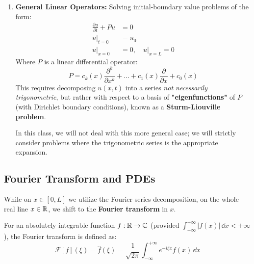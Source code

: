 \begin{remark}
\begin{enumerate}
    \item \textbf{General Linear Operators:} Solving initial-boundary value problems of the form:
    \begin{align*}
        \frac{\partial u}{\partial t} + P u &= 0 \\
        u|_{t=0} &= u_0 \\
        u|_{x=0} &= 0, \quad u|_{x=L} = 0
    \end{align*}
    Where $P$ is a linear differential operator:
    \begin{equation*}
        P = c_k(x) \frac{\partial^k}{\partial x^k} + \dots + c_1(x) \frac{\partial}{\partial x} + c_0(x)
    \end{equation*}
    This requires decomposing $u(x,t)$ into a series \textit{not necessarily trigonometric}, but rather with respect to a basis of \textbf{"eigenfunctions"} of $P$ (with Dirichlet boundary conditions), known as a \textbf{Sturm-Liouville problem}.
    
    In this class, we will not deal with this more general case; we will strictly consider problems where the trigonometric series is the appropriate expansion.
\end{enumerate}
\end{remark}

\subsection{Fourier Transform and PDEs}

While on $x \in [0,L]$ we utilize the Fourier series decomposition, on the whole real line $x \in \mathbb{R}$, we shift to the \textbf{Fourier transform} in $x$.

\begin{recall}
For an absolutely integrable function $f: \mathbb{R} \to \mathbb{C}$ (provided $\int_{-\infty}^{+\infty} |f(x)| \, \dd x < +\infty$), the Fourier transform is defined as:
\begin{equation*}
    \mathcal{F}[f](\xi) = \hat{f}(\xi) = \frac{1}{\sqrt{2\pi}} \int_{-\infty}^{+\infty} e^{-i\xi x} f(x) \, \dd x
\end{equation*}
\end{recall}